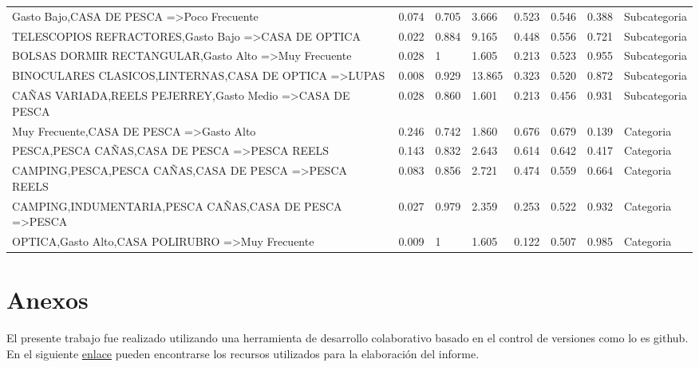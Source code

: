 \documentclass[]{article}
\begin{document}
\begin{landscape}
\begin{table}[htbp]
\begin{tabular}{llllllll}
				{Gasto Bajo,CASA DE PESCA} =\textgreater {Poco Frecuente} & 0.074 & 0.705 & 3.666 & 0.523 & 0.546 & 0.388 & Subcategoria \\
				{TELESCOPIOS REFRACTORES,Gasto Bajo} =\textgreater {CASA DE OPTICA} & 0.022 & 0.884 & 9.165 & 0.448 & 0.556 & 0.721 & Subcategoria \\
				{BOLSAS DORMIR RECTANGULAR,Gasto Alto} =\textgreater {Muy Frecuente} & 0.028 & 1     & 1.605 & 0.213 & 0.523 & 0.955 & Subcategoria \\
				{BINOCULARES CLASICOS,LINTERNAS,CASA DE OPTICA} =\textgreater {LUPAS} & 0.008 & 0.929 & 13.865 & 0.323 & 0.520 & 0.872 & Subcategoria \\
				{CAÑAS VARIADA,REELS PEJERREY,Gasto Medio} =\textgreater {CASA DE PESCA} & 0.028 & 0.860 & 1.601 & 0.213 & 0.456 & 0.931 & Subcategoria \\
				{Muy Frecuente,CASA DE PESCA} =\textgreater {Gasto Alto} & 0.246 & 0.742 & 1.860 & 0.676 & 0.679 & 0.139 & Categoria \\
				{PESCA,PESCA CAÑAS,CASA DE PESCA} =\textgreater {PESCA REELS} & 0.143 & 0.832 & 2.643 & 0.614 & 0.642 & 0.417 & Categoria \\
				{CAMPING,PESCA,PESCA CAÑAS,CASA DE PESCA} =\textgreater {PESCA REELS} & 0.083 & 0.856 & 2.721 & 0.474 & 0.559 & 0.664 & Categoria \\
				{CAMPING,INDUMENTARIA,PESCA CAÑAS,CASA DE PESCA} =\textgreater {PESCA} & 0.027 & 0.979 & 2.359 & 0.253 & 0.522 & 0.932 & Categoria \\
				{OPTICA,Gasto Alto,CASA POLIRUBRO} =\textgreater {Muy Frecuente} & 0.009 & 1     & 1.605 & 0.122 & 0.507 & 0.985 & Categoria \\
			\end{tabular}%
			\label{Tab_Reg_Anio}%
		\end{table}%
		
		
	\end{landscape}
	\restoregeometry
	
	\section{Anexos}
	
	El presente trabajo fue realizado utilizando una herramienta de desarrollo colaborativo basado en el control de versiones como lo es github.\\
	
	\noindent En el siguiente \href{https://github.com/jairoji/DM_TP1/tree/master/TP1}{enlace} pueden encontrarse los recursos utilizados para la elaboración del informe.\\ 
	
\end{document}
